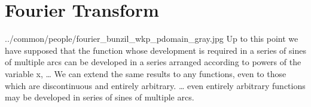 
\chapter{Fourier Transform}
\label{app:fourier}

  {../common/people/fourier_bunzil_wkp_pdomain_gray.jpg}
  {%
  Up to this point we have supposed that the function
  whose development is required in a series of sines of multiple
  arcs can be developed in a series arranged according to powers
  of the variable x, 
  \ldots
  We can extend the same results to any functions, even
  to those which are discontinuous and entirely arbitrary.
  \ldots
  even entirely arbitrary functions may be developed in series of sines
  of multiple arcs.
  }

